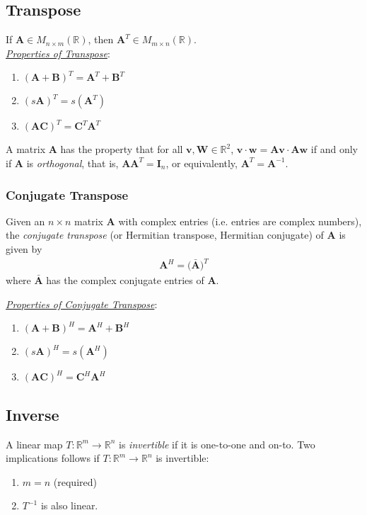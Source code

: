 \subsection{Transpose}
If $\bm{A}\in M_{n\times m}(\mathbb{R})$, then $\bm{A}^T\in M_{m\times n}(\mathbb{R})$.\\

\noindent\underline{\textit{Properties of Transpose}}:
\begin{enumerate}[label=\theenumi)]
    \item $(\bm{A}+\bm{B})^T = \bm{A}^T+\bm{B}^T$
    \item $(s\bm{A})^T = s(\bm{A}^T)$
    \item $(\bm{AC})^T = \bm{C}^T\bm{A}^T$
\end{enumerate}

\begin{theorem}
A matrix $\bm{A}$ has the property that for all $\bm{v}, \bm{W}\in\mathbb{R}^2$, $\bm{v}\cdot\bm{w}=\bm{Av}\cdot\bm{Aw}$ if and only if $\bm{A}$ is \emph{orthogonal}, that is, $\bm{AA}^T=\bm{I}_n$, or equivalently, $\bm{A}^T=\bm{A}^{-1}$. 
\end{theorem}

\subsubsection{Conjugate Transpose}
\begin{definition}
  Given an $n\times n$ matrix $\bm{A}$ with complex entries (i.e. entries are complex numbers), the \emph{conjugate transpose} (or Hermitian transpose, Hermitian conjugate) of $\bm{A}$ is given by
  \begin{align}
    \bm{A}^H=\Big(\bar{\bm{A}}\Big)^T
  \end{align}
where $\bar{\bm{A}}$ has the complex conjugate entries of $\bm{A}$.
\end{definition}
\noindent\underline{\textit{Properties of Conjugate Transpose}}:
\begin{enumerate}[label=\theenumi)]
    \item $(\bm{A}+\bm{B})^H = \bm{A}^H+\bm{B}^H$
    \item $(s\bm{A})^H = s(\bm{A}^H)$
    \item $(\bm{AC})^H = \bm{C}^H\bm{A}^H$
\end{enumerate}


\subsection{Inverse}
\begin{definition}[Invertibility]
 A linear map $T:\mathbb{R}^m\rightarrow\mathbb{R}^n$ is \emph{invertible} if it is one-to-one and on-to. 
Two implications follows if 
    $T:\mathbb{R}^m\rightarrow\mathbb{R}^n$ is invertible:
    \begin{enumerate}[label=\theenumi)]
        \item $m=n$ (required)
        \item $T^{-1}$ is also linear.
    \end{enumerate}
\end{definition}

